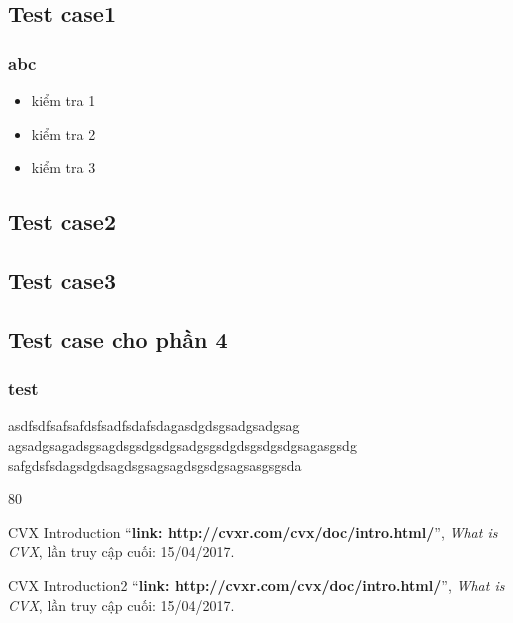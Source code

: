 \documentclass[a4paper]{article}
\begin{document}
    \subsection{Test case1}
        \subsubsection{abc}
    \begin{itemize}
         \item kiểm tra 1
        \item  kiểm tra 2
        \item   kiểm tra 3
    \end{itemize}
       

    \subsection{Test case2}
    \subsection{Test case3}
    \subsection{Test case cho phần 4}
    \subsubsection{test}
    asdfsdfsafsafdsfsadfsdafsdagasdgdsgsadgsadgsag
    agsadgsagadsgsagdsgsdgsdgsadgsgsdgdsgsdgsdgsagasgsdg
    safgdsfsdagsdgdsagdsgsagsagdsgsdgsagsasgsgsda
   

\begin{thebibliography}{80}

CVX Introduction
``\textbf{link: http://cvxr.com/cvx/doc/intro.html/}'',
\textit{What is CVX}, lần truy cập cuối: 15/04/2017.

CVX Introduction2
``\textbf{link: http://cvxr.com/cvx/doc/intro.html/}'',
\textit{What is CVX}, lần truy cập cuối: 15/04/2017.

\end{thebibliography}
\end{document}
